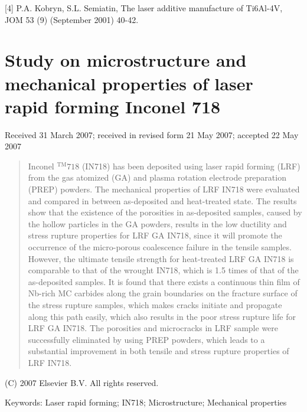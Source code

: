 \documentclass[10pt]{article}
\begin{document}
[4] P.A. Kobryn, S.L. Semiatin, The laser additive manufacture of Ti6Al-4V, JOM 53 (9) (September 2001) 40-42.

\section*{Study on microstructure and mechanical properties of laser rapid forming Inconel 718 }
Received 31 March 2007; received in revised form 21 May 2007; accepted 22 May 2007

\begin{abstract}
Inconel $^{\mathrm{TM}} 718$ (IN718) has been deposited using laser rapid forming (LRF) from the gas atomized (GA) and plasma rotation electrode preparation (PREP) powders. The mechanical properties of LRF IN718 were evaluated and compared in between as-deposited and heat-treated state. The results show that the existence of the porosities in as-deposited samples, caused by the hollow particles in the GA powders, results in the low ductility and stress rupture properties for LRF GA IN718, since it will promote the occurrence of the micro-porous coalescence failure in the tensile samples. However, the ultimate tensile strength for heat-treated LRF GA IN718 is comparable to that of the wrought IN718, which is 1.5 times of that of the as-deposited samples. It is found that there exists a continuous thin film of Nb-rich MC carbides along the grain boundaries on the fracture surface of the stress rupture samples, which makes cracks initiate and propagate along this path easily, which also results in the poor stress rupture life for LRF GA IN718. The porosities and microcracks in LRF sample were successfully eliminated by using PREP powders, which leads to a substantial improvement in both tensile and stress rupture properties of LRF IN718.
\end{abstract}

(C) 2007 Elsevier B.V. All rights reserved.

Keywords: Laser rapid forming; IN718; Microstructure; Mechanical properties
\end{document}
